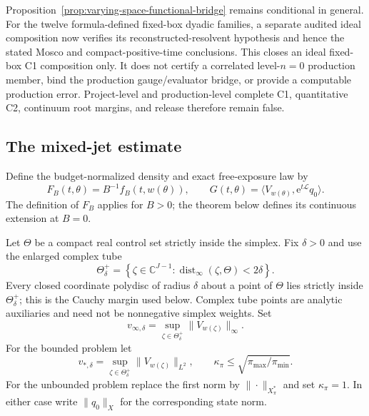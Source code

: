 \documentclass[aps,physrev,onecolumn,amsmath,amssymb,longbibliography]{revtex4-2}
\newcommand{\e}{\mathrm e}
\newcommand{\Lfree}{\mathcal L}
\begin{document}
Proposition~\ref{prop:varying-space-functional-bridge} remains conditional in
general.  For the twelve formula-defined fixed-box dyadic families, a separate
audited ideal composition now verifies its reconstructed-resolvent hypothesis
and hence the stated Mosco and compact-positive-time conclusions.  This closes
an ideal fixed-box C1 composition only.  It does not certify a correlated
level-\(n=0\) production member, bind the production gauge/evaluator bridge,
or provide a computable production error.  Project-level and production-level
complete C1, quantitative C2, continuum root margins, and release therefore
remain false.

\subsection{The mixed-jet estimate}

Define the budget-normalized density and exact free-exposure law by
\begin{equation}
 F_B(t,\theta)=B^{-1}f_B(t,w(\theta)),\qquad
 G(t,\theta)=\langle V_{w(\theta)},\e^{t\Lfree}q_0\rangle.
 \label{eq:F-and-G}
\end{equation}
The definition of \(F_B\) applies for \(B>0\); the theorem below defines its
continuous extension at \(B=0\).

Let \(\Theta\) be a compact real control set strictly inside the simplex.  Fix
\(\delta>0\) and use the enlarged complex tube
\begin{equation}
 \Theta_\delta^+=
 \left\{\zeta\in\mathbb C^{J-1}:
 \operatorname{dist}_\infty(\zeta,\Theta)<2\delta\right\}.
 \label{eq:enlarged-control-tube}
\end{equation}
Every closed coordinate polydisc of radius \(\delta\) about a point of
\(\Theta\) lies strictly inside \(\Theta_\delta^+\); this is the Cauchy margin
used below.  Complex tube points are analytic auxiliaries and need not be
nonnegative simplex weights.  Set
\begin{equation}
 v_{\infty,\delta}=
 \sup_{\zeta\in\Theta_\delta^+}\|V_{w(\zeta)}\|_\infty.
 \label{eq:v-infty}
\end{equation}
For the bounded problem let
\begin{equation}
 v_{*,\delta}=
 \sup_{\zeta\in\Theta_\delta^+}\|V_{w(\zeta)}\|_{L^2},
 \qquad
 \kappa_\pi\le\sqrt{\pi_{\max}/\pi_{\min}}.
 \label{eq:bounded-constants}
\end{equation}
For the unbounded problem replace the first norm by
\(\|\cdot\|_{X_\pi^*}\) and set \(\kappa_\pi=1\).  In either case write
\(\|q_0\|_X\) for the corresponding state norm.
\end{document}
